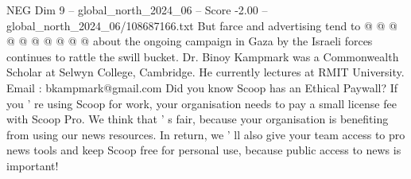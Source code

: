 \begin{textsample}{NEG Dim 9 – global\_north\_2024\_06 – Score -2.00 – global\_north\_2024\_06/108687166.txt}
But farce and advertising tend to @ @ @ @ @ @ @ @ @ @ about the ongoing campaign in Gaza by the Israeli forces continues to rattle the swill bucket.
Dr.
Binoy Kampmark was a Commonwealth Scholar at Selwyn College, Cambridge.
He currently lectures at RMIT University.
Email : bkampmark@gmail.com Did you know Scoop has an Ethical Paywall?
If you ' re using Scoop for work, your organisation needs to pay a small license fee with Scoop Pro.
We think that ' s fair, because your organisation is benefiting from using our news resources.
In return, we ' ll also give your team access to pro news tools and keep Scoop free for personal use, because public access to news is important!

\end{textsample}
